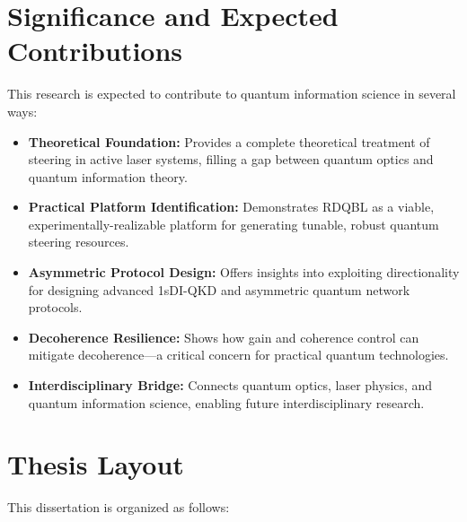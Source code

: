 \section{Significance and Expected Contributions}

This research is expected to contribute to quantum information science in several ways:

\begin{itemize}
	\item \textbf{Theoretical Foundation:} Provides a complete theoretical treatment of steering in active laser systems, filling a gap between quantum optics and quantum information theory.

	\item \textbf{Practical Platform Identification:} Demonstrates RDQBL as a viable, experimentally-realizable platform for generating tunable, robust quantum steering resources.

	\item \textbf{Asymmetric Protocol Design:} Offers insights into exploiting directionality for designing advanced 1sDI-QKD and asymmetric quantum network protocols.

	\item \textbf{Decoherence Resilience:} Shows how gain and coherence control can mitigate decoherence—a critical concern for practical quantum technologies.

	\item \textbf{Interdisciplinary Bridge:} Connects quantum optics, laser physics, and quantum information science, enabling future interdisciplinary research.
\end{itemize}

\section{Thesis Layout}

This dissertation is organized as follows:


